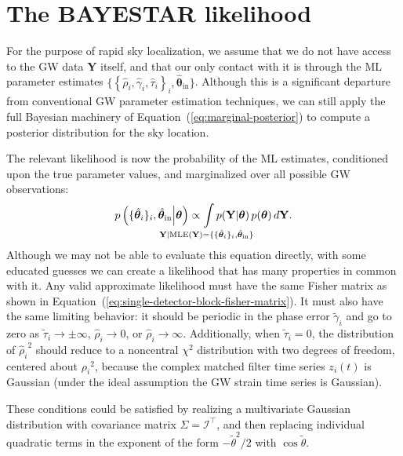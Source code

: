 \documentclass[amsmath,amssymb,aps,prx,reprint,nopreprintnumbers,nofootinbib,showpacs]{revtex4-1}
\def\clap#1{\hbox to 0pt{\hss#1\hss}}
\def\mathclap{\mathpalette\mathclapinternal}
\def\mathclapinternal#1#2{\clap{$\mathsurround=0pt#1{#2}$}}
\begin{document}
\section{The \acs{BAYESTAR} likelihood}
\label{sec:bayestar-likelihood}

For the purpose of rapid sky localization, we assume that we do not have access to the \ac{GW} data $\mathbf{Y}$ itself, and that our only contact with it is through the \ac{ML} parameter estimates $\{\left\{ \hat\rho_i, \hat\gamma_i, \hat\tau_i \right\}_i, \hat{\bm\theta}_\mathrm{in}\}$. Although this is a significant departure from conventional \ac{GW} parameter estimation techniques, we can still apply the full Bayesian machinery of Equation~(\ref{eq:marginal-posterior}) to compute a posterior distribution for the sky location.

The relevant likelihood is now the probability of the \ac{ML} estimates, conditioned upon the true parameter values, and marginalized over all possible \ac{GW} observations:
%
\begin{equation}\label{eq:detection-candidate-likelihood}
    p\left(\{\hat{\bm\theta}_i\}_i,
        \hat{\bm\theta}_\mathrm{in}
    \middle| \bm\theta\right)
    \propto \int\limits_{\mathclap{\mathbf{Y} | \mathrm{MLE}(\mathbf{Y}) =
        \{\{\hat{\bm\theta}_i\}_i,
        \hat{\bm\theta}_\mathrm{in}\}}}
    p(\mathbf{Y} | \bm\theta) \, p(\bm\theta)
    \, d\mathbf{Y}.
\end{equation}
%
Although we may not be able to evaluate this equation directly, with some educated guesses we can create a likelihood that has many properties in common with it. Any valid approximate likelihood must have the same Fisher matrix as shown in Equation~(\ref{eq:single-detector-block-fisher-matrix}). It must also have the same limiting behavior: it should be periodic in the phase error $\tilde{\gamma}_i$ and go to zero as $\tilde{\tau}_i \rightarrow \pm \infty$, $\hat{\rho}_i \rightarrow 0$, or $\hat{\rho}_i \rightarrow \infty$. Additionally, when $\tilde{\tau}_i = 0$, the distribution of ${\hat{\rho}_i}^2$ should reduce to a noncentral $\chi^2$ distribution with two degrees of freedom, centered about ${\rho_i}^2$, because the complex matched filter time series $z_i(t)$ is Gaussian (under the ideal assumption the \ac{GW} strain time series is Gaussian).

These conditions could be satisfied by realizing a multivariate Gaussian distribution with covariance matrix $\Sigma = \mathcal{I}^\intercal$, and then replacing individual quadratic terms in the exponent of the form $-\tilde{\theta}^2/2$ with $\cos{\tilde{\theta}}$.
\end{document}
